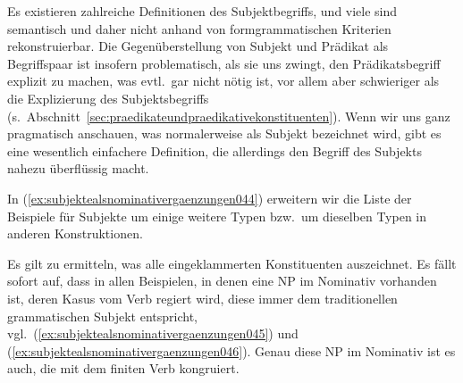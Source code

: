 \begin{exe}
  \ex\label{ex:subjektealsnominativergaenzungen036}
  \begin{xlist}
  \end{xlist}
\end{exe}


Es existieren zahlreiche Definitionen des Subjektbegriffs, und viele sind semantisch und daher nicht anhand von formgrammatischen Kriterien rekonstruierbar.
Die Gegenüberstellung von Subjekt und Prädikat als Begriffspaar ist insofern problematisch, als sie uns zwingt, den Prädikatsbegriff explizit zu machen, was evtl.\ gar nicht nötig ist, vor allem aber schwieriger als die Explizierung des Subjektsbegriffs (s.\ Abschnitt~\ref{sec:praedikateundpraedikativekonstituenten}).
Wenn wir uns ganz pragmatisch anschauen, was normalerweise als Subjekt bezeichnet wird, gibt es eine wesentlich einfachere Definition, die allerdings den Begriff des Subjekts nahezu überflüssig macht.

In (\ref{ex:subjektealsnominativergaenzungen044}) erweitern wir die Liste der Beispiele für Subjekte um einige weitere Typen bzw.\ um dieselben Typen in anderen Konstruktionen.

\begin{exe}
  \ex\label{ex:subjektealsnominativergaenzungen044}
  \begin{xlist}
  \end{xlist}
\end{exe}

Es gilt zu ermitteln, was alle eingeklammerten Konstituenten auszeichnet.
Es fällt sofort auf, dass in allen Beispielen, in denen eine NP im Nominativ vorhanden ist, deren Kasus vom Verb regiert wird, diese immer dem traditionellen grammatischen Subjekt entspricht, vgl.\ (\ref{ex:subjektealsnominativergaenzungen045}) und (\ref{ex:subjektealsnominativergaenzungen046}).
Genau diese NP im Nominativ ist es auch, die mit dem finiten Verb kongruiert.


